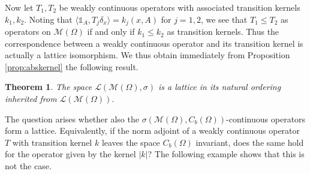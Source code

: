 \documentclass{amsart}
\numberwithin{equation}{section}
\newtheorem{thm}{Theorem}[section]
\theoremstyle{remark}
\theoremstyle{definition}
\begin{document}
Now let $T_1, T_2$ be weakly continuous operators  with associated transition kernels $k_1, k_2$. Noting that 
${\langle {\mathds{1}_A},{T_j\delta_x}\rangle} = k_j(x,A)$ for $j=1,2$, we see that $T_1 \leq T_2$ as operators 
on $\mathscr{M}(\Omega)$ if and only if $k_1 \leq k_2$ as transition kernels. Thus the correspondence between a weakly continuous
operator and its transition kernel is actually a lattice isomorphism. 
We thus obtain immediately from Proposition \ref{prop:abskernel} the following result.

\begin{thm}
\label{thm:weakcontlattice}
	The space $\mathscr{L}(\mathscr{M}(\Omega),\sigma)$ is a lattice in its natural ordering inherited from
	$\mathscr{L}(\mathscr{M}(\Omega))$.
\end{thm}

The question arises whether also the $\sigma (\mathscr{M}(\Omega), C_b(\Omega))$-continuous operators form a lattice.
Equivalently, if the norm adjoint of a weakly continuous operator $T$ with transition kernel $k$ leaves 
the space $C_b(\Omega)$ invariant, does the same hold for the operator given by the kernel $\lvert k\rvert$? 
The following example shows that this is not the case.
\end{document}
